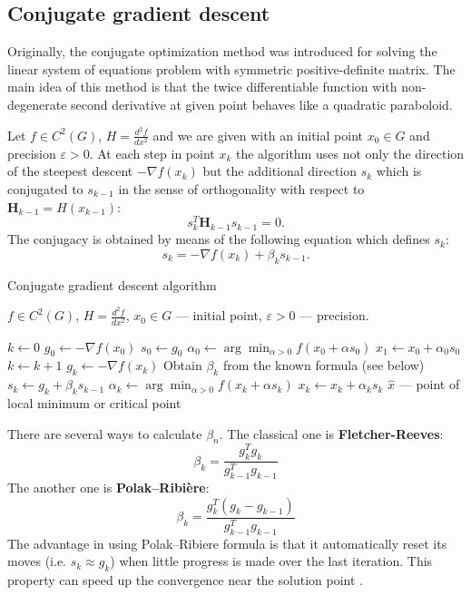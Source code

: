 \documentclass[12pt, bachelor, substylefile = algo_title.rtx]{disser}
\newcommand{\eps}{\varepsilon}
\theoremstyle{definition}
\begin{document}
\subsection{Conjugate gradient descent}
Originally, the conjugate optimization method was introduced for solving the linear system of equations problem with symmetric positive-definite matrix. The main idea of this method is that the twice differentiable function with non-degenerate second derivative at given point behaves like a quadratic paraboloid. 

Let $f \in C^2(G)$, $H = \frac{d^2 f}{dx^2}$ and we are given with an initial point $x_0 \in G$ and precision $\eps > 0$. At each step in point $x_k$ the algorithm uses not only the direction of the steepest descent $-\nabla f(x_k)$ but the additional direction $s_k$ which is conjugated to $s_{k-1}$ in the sense of orthogonality with respect to $\mathbf{H}_{k-1} = H(x_{k-1})$:
\[ s_k ^{T} \mathbf{H}_{k-1} s_{k-1} = 0. \]
The conjugacy is obtained by means of the following equation which defines $s_k$:
\[ s_k = -\nabla f(x_k) + \beta_k s_{k-1}. \]

\begin{algorithm}[h]
\caption{Conjugate gradient descent algorithm}
\label{alg: conjgrad}
\begin{algorithmic}

\Require $f \in C^2(G)$, $H = \frac{d^2 f}{dx^2}$, $x_0 \in G$ --- initial point, $\eps>0$ --- precision. 

\State $k \gets 0$
\State $g_0 \gets -\nabla f(x_0)$
\State $s_0 \gets g_0$
\State $\alpha_0 \gets \arg \min_{\alpha>0} f(x_0 + \alpha s_0)$
\State $x_1 \gets x_0 + \alpha_0 s_0$
\While{$\|x_k - x_{k-1}\| > \eps$}
\State $k \gets k+1$
\State $g_k \gets -\nabla f(x_k)$
\State Obtain $\beta_k$ from the known formula (see below)
\State $s_k \gets g_k + \beta_k s_{k-1}$
\State $\alpha_k \gets \arg \min_{\alpha>0} f(x_k + \alpha s_k)$
\State $x_k \gets x_k + \alpha_k s_k$
\EndWhile
\Ensure $\widehat{x}$ --- point of local minimum or critical point
\end{algorithmic}
\end{algorithm}


There are several ways to calculate $\beta_n$. The classical one is \textbf{Fletcher-Reeves}:
\[ \beta_k = \frac{g^T_k g_k}{g^T_{k-1} g_{k-1}} \]
The another one is \textbf{Polak–Ribière}:
\[ \beta_k = \frac{g^T_k (g_k - g_{k-1})}{g^T_{k-1} g_{k-1}} \]
The advantage in using Polak–Ribiere formula is that it automatically reset its moves (i.e. $s_k \approx g_k$) when little progress is made over the last iteration. This property can speed up the convergence near the solution point \cite{cavazzuti13}.
\end{document}
